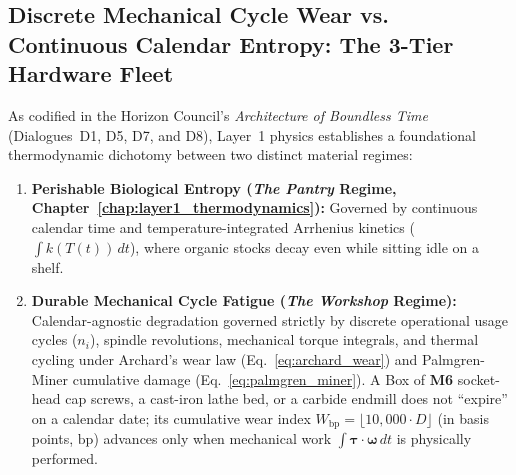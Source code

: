 \subsection{Discrete Mechanical Cycle Wear vs. Continuous Calendar Entropy: The 3-Tier Hardware Fleet}
\label{subsec:mech_three_tier_fleet}
As codified in the Horizon Council's \textit{Architecture of Boundless Time} (Dialogues~D1, D5, D7, and D8), Layer~1 physics establishes a foundational thermodynamic dichotomy between two distinct material regimes:
\begin{enumerate}
    \item \textbf{Perishable Biological Entropy (\textit{The Pantry} Regime, Chapter~\ref{chap:layer1_thermodynamics}):} Governed by continuous calendar time and temperature-integrated Arrhenius kinetics ($\int k(T(t))\,dt$), where organic stocks decay even while sitting idle on a shelf.
    \item \textbf{Durable Mechanical Cycle Fatigue (\textit{The Workshop} Regime):} Calendar-agnostic degradation governed strictly by discrete operational usage cycles ($n_i$), spindle revolutions, mechanical torque integrals, and thermal cycling under Archard's wear law (Eq.~\ref{eq:archard_wear}) and Palmgren-Miner cumulative damage (Eq.~\ref{eq:palmgren_miner}). A Box of \textbf{M6} socket-head cap screws, a cast-iron lathe bed, or a carbide endmill does not ``expire'' on a calendar date; its cumulative wear index $W_{\mathrm{bp}} = \lfloor 10{,}000 \cdot D \rfloor$ (in basis points, $\mathrm{bp}$) advances only when mechanical work $\int \boldsymbol{\tau}\cdot\boldsymbol{\omega}\,dt$ is physically performed.
\end{enumerate}

